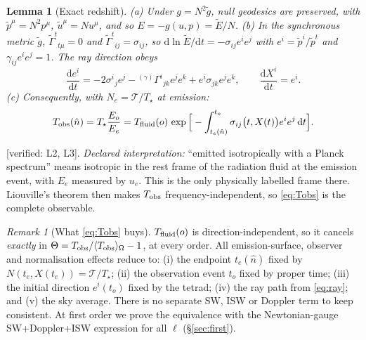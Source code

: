 \documentclass[11pt]{article}
\newtheorem{lemma}{Lemma}
\theoremstyle{definition}
\theoremstyle{remark}
\newtheorem{remark}{Remark}
\newcommand{\Tref}{\mathcal{T}}
\newcommand{\nhat}{\hat n}
\newcommand{\dd}{\mathrm{d}}
\newcommand{\sky}[1]{\langle #1\rangle_{\Omega}}
\newcommand{\status}[1]{\textsf{[#1]}}
\begin{document}
\begin{lemma}[Exact redshift]\label{lem:redshift}
(a) Under $g=N^2\tilde g$, null geodesics are preserved, with
$\tilde p^\mu=N^2p^\mu$, $\tilde u^\mu=Nu^\mu$, and so $E=-g(u,p)=\tilde
E/N$. (b) In the synchronous metric $\tilde g$,
$\tilde\Gamma^t{}_{t\mu}=0$ and $\tilde\Gamma^t{}_{ij}=\sigma_{ij}$, so
$\dd\ln\tilde E/\dd t=-\sigma_{ij}e^ie^j$ with $e^i=\tilde p^i/\tilde p^t$
and $\gamma_{ij}e^ie^j=1$. The ray direction obeys
\begin{equation}\label{eq:ray}
\frac{\dd e^i}{\dd t}=-2\sigma^i{}_je^j-{}^{(\gamma)}\Gamma^i{}_{jk}e^je^k+e^i\sigma_{jk}e^je^k,
\qquad \frac{\dd X^i}{\dd t}=e^i.
\end{equation}
(c) Consequently, with $N_e=\Tref/T_\star$ at emission:
\begin{equation}\label{eq:Tobs}
T_{\rm obs}(\nhat)=T_\star\frac{E_o}{E_e}=T_{\rm fluid}(o)\,
\exp\Big[-\int_{t_e(\nhat)}^{t_o}\sigma_{ij}\big(t,X(t)\big)e^ie^j\,\dd t\Big].
\end{equation}
\end{lemma}
\status{verified: L2, L3}. \emph{Declared interpretation:} ``emitted
isotropically with a Planck spectrum'' means isotropic in the rest frame of
the radiation fluid at the emission event, with $E_e$ measured by $u_e$. This
is the only physically labelled frame there. Liouville's theorem then makes
$T_{\rm obs}$ frequency-independent, so \eqref{eq:Tobs} is the complete
observable.

\begin{remark}[What \eqref{eq:Tobs} buys]
$T_{\rm fluid}(o)$ is direction-independent, so it cancels \emph{exactly} in
$\Theta=T_{\rm obs}/\sky{T_{\rm obs}}-1$, at every order. All
emission-surface, observer and normalisation effects reduce to:
(i) the endpoint $t_e(\nhat)$ fixed by $N(t_e,X(t_e))=\Tref/T_\star$;
(ii) the observation event $t_o$ fixed by proper time;
(iii) the initial direction $e^i(t_o)$ fixed by the tetrad;
(iv) the ray path from \eqref{eq:ray}; and
(v) the sky average.
There is no separate SW, ISW or Doppler term to keep consistent. At first
order we prove the equivalence with the Newtonian-gauge SW+Doppler+ISW
expression for all $\ell$ (\S\ref{sec:first}).
\end{remark}
\end{document}
